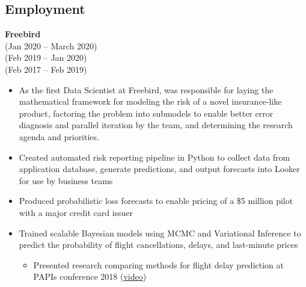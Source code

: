 \documentclass{res}
\begin{document}
 
\setlength{\parskip}{10pt}
\renewcommand{\labelitemi}{\scriptsize$\bullet$} 

\address{\hspace{2pt}} %
\address{\href{http://maxlivingston.org}{maxlivingston.org}}

\begin{resume}
  \setlength{\sectionskip}{0pt}
  \section{Employment}
  \setlength{\sectionskip}{5pt}
  \vspace{2pt}
    {\bf Freebird} \\ 
   \hspace{3pt} (Jan 2020 -- March 2020) \\
   \hspace{17pt} (Feb 2019 -- Jan 2020) \\
   \hspace{49pt} (Feb 2017 -- Feb 2019)
  \vspace{2pt}
  \begin{itemize} \itemsep 2.0pt \parskip 2.0pt %
    \item As the first Data Scientist at Freebird, was responsible for laying the mathematical framework for modeling the risk of a novel insurance-like product, factoring the problem into submodels to enable better error diagnosis and parallel iteration by the team, and determining the research agenda and priorities.
    \item Created automated risk reporting pipeline in Python to collect data from application database, generate predictions, and output forecasts into Looker for use by business teams
    \item Produced probabilistic loss forecasts to enable pricing of a \$5 million pilot with a major credit card issuer
    \item Trained scalable Bayesian models using MCMC and Variational Inference to predict the probability of flight cancellations, delays, and last-minute prices
    \setlength{\parskip}{-2pt} 
    \begin{itemize}
      \setlength{\itemsep}{1.0pt}
    \item Presented research comparing methods for flight delay prediction at PAPIs conference 2018 (\href{https://www.infoq.com/presentations/flight-bayesian-prediction}{video})

\end{itemize}
\end{itemize}
\end{resume}
\end{document}
